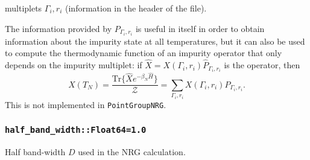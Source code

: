 \documentclass[notitlepage]{article}
\begin{document}
multiplets $\Gamma_i,r_i$ (information in the header of the
file). 
\par
The information provided by $P_{\Gamma_i,r_i}$ is useful in
itself in order to obtain information about the impurity
state at all temperatures, but it can also be used to
compute the thermodynamic function of an impurity operator 
that only depends on the impurity multiplet: if $\hat
X=X(\Gamma_i,r_i) \hat{P}_{\Gamma_i,r_i}$ is the operator,
then
\begin{equation}
    X(T_N) 
    = 
    \frac{
        \text{Tr}
        \{\hat X e^{-\beta_N\hat H}\}
    }{
        \mathcal Z
    }
    =
    \sum_{\Gamma_i,r_i}
    X(\Gamma_i,r_i)
    P_{\Gamma_i,r_i}.
\end{equation}
This is not implemented in \texttt{PointGroupNRG}.

\subsubsection{\texttt{half\_band\_width::Float64=1.0}}
\label{nrg_bandwidth}
Half band-width $D$ used in the NRG calculation.
\end{document}
